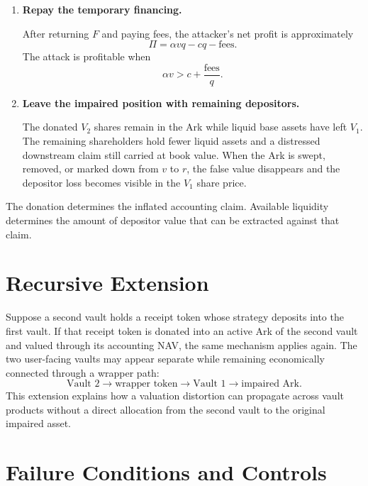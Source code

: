 \documentclass[11pt]{article}
\begin{document}
\begin{enumerate}
    \item \textbf{Repay the temporary financing.}

    After returning $F$ and paying fees, the attacker's net profit is approximately
    \begin{equation}
        \Pi = \alpha vq-cq-\text{fees}.
    \end{equation}
    The attack is profitable when
    \begin{equation}
        \alpha v > c + \frac{\text{fees}}{q}.
    \end{equation}

    \item \textbf{Leave the impaired position with remaining depositors.}

    The donated $V_2$ shares remain in the Ark while liquid base assets have left $V_1$.  The remaining shareholders hold fewer liquid assets and a distressed downstream claim still carried at book value.  When the Ark is swept, removed, or marked down from $v$ to $r$, the false value disappears and the depositor loss becomes visible in the $V_1$ share price.
\end{enumerate}

The donation determines the inflated accounting claim.  Available liquidity determines the amount of depositor value that can be extracted against that claim.

\section{Recursive Extension}

Suppose a second vault holds a receipt token whose strategy deposits into the first vault.  If that receipt token is donated into an active Ark of the second vault and valued through its accounting NAV, the same mechanism applies again.  The two user-facing vaults may appear separate while remaining economically connected through a wrapper path:
\begin{equation}
    \text{Vault 2}
    \longrightarrow \text{wrapper token}
    \longrightarrow \text{Vault 1}
    \longrightarrow \text{impaired Ark}.
\end{equation}
This extension explains how a valuation distortion can propagate across vault products without a direct allocation from the second vault to the original impaired asset.

\section{Failure Conditions and Controls}
\end{document}
